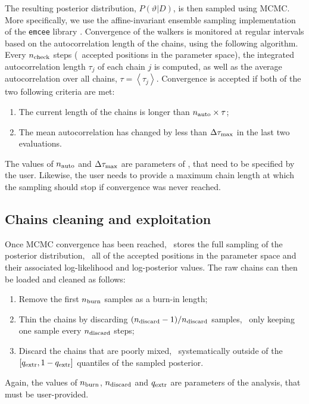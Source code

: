 The resulting posterior distribution, $P(\vartheta | D)$, is then sampled using MCMC.
More specifically, we use the affine-invariant ensemble sampling implementation of the \texttt{emcee} library \cite{foreman-mackey_emcee_2019}.
Convergence of the walkers is monitored at regular intervals based on the autocorrelation length of the chains, using the following algorithm.
Every $n_{\rm check}$ steps (\ie\ accepted positions in the parameter space), the integrated autocorrelation length $\tau_j$ of each chain $j$ is computed, as well as the average autocorrelation over all chains, $\tau = \left< \tau_j \right>$.
Convergence is accepted if both of the two following criteria are met:
\begin{enumerate}[leftmargin=*]
    \item The current length of the chains is longer than $n_{\rm auto} \times \tau$;
    \item The mean autocorrelation has changed by less than $\Delta\tau_{\rm max}$ in the last two evaluations.
\end{enumerate}
The values of $n_{\rm auto}$ and $\Delta\tau_{\rm max}$ are parameters of \panco, that need to be specified by the user.
Likewise, the user needs to provide a maximum chain length at which the sampling should stop if convergence was never reached.

\subsection{Chains cleaning and exploitation} \label{sec:algo:outputs}

Once MCMC convergence has been reached, \panco\ stores the full sampling of the posterior distribution, \ie\ all of the accepted positions in the parameter space and their associated log-likelihood and log-posterior values.
The raw chains can then be loaded and cleaned as follows:
\begin{enumerate}[leftmargin=*]
    \item Remove the first $n_{\rm burn}$ samples as a burn-in length;
    \item Thin the chains by discarding $(n_{\rm discard} - 1) / n_{\rm discard}$ samples, \ie\ only keeping one sample every $n_{\rm discard}$ steps;
    \item Discard the chains that are poorly mixed, \ie\ systematically outside of the $[q_{\rm extr}, 1 - q_{\rm extr}]$ quantiles of the sampled posterior.
\end{enumerate}
Again, the values of $n_{\rm burn}$, $n_{\rm discard}$ and $q_{\rm extr}$ are parameters of the analysis, that must be user-provided.

